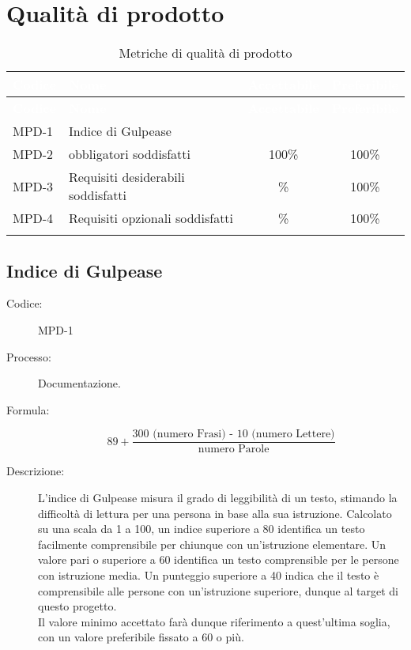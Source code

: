 \section{Qualità di prodotto} \label{sec:qualityprod}

{
\setlength{\tabcolsep}{10pt}
\renewcommand{\arraystretch}{1.5}
\begin{xltabular}{\textwidth}{| l | X | c | c |}
    \hline
     \textbf{\textcolor{white}{Codice}} & \textbf{\textcolor{white}{Nome}} & \textbf{\textcolor{white}{Accettabile}} & \textbf{\textcolor{white}{Preferibile}} \\
    \hline
    \endfirsthead
    \hline
     \textbf{\textcolor{white}{Codice}} & \textbf{\textcolor{white}{Nome}} & \textbf{\textcolor{white}{Accettabile}} & \textbf{\textcolor{white}{Preferibile}} \\ 
    \endhead
    MPD-1 & Indice di Gulpease &  &  \\
    \hline
    MPD-2 &  obbligatori soddisfatti & 100\% & 100\% \\
    \hline
    MPD-3 & Requisiti desiderabili soddisfatti & \% & 100\% \\
    \hline
    MPD-4 & Requisiti opzionali soddisfatti & \% & 100\% \\
    \hline
     \caption{Metriche di qualità di prodotto}
    \label{tab:mpd}
\end{xltabular}
}

\subsection{Indice di Gulpease}
\begin{description}
    \item[Codice:] MPD-1
    \item[Processo:] Documentazione.
    \item[Formula:] 
    \begin{equation}
    89 +
    \frac{\text{300 (numero Frasi) - 10 (numero Lettere)}}{\text{numero Parole}}
    \label{MPD-1}
    \end{equation}
    \item[Descrizione:] L'indice di Gulpease misura il grado di leggibilità di un testo, stimando la difficoltà di lettura per una persona in base alla sua istruzione. Calcolato su una scala da 1 a 100, un indice superiore a 80 identifica un testo facilmente comprensibile per chiunque con un'istruzione elementare. Un valore pari o superiore a 60 identifica un testo comprensible per le persone con istruzione media. Un punteggio superiore a 40 indica che il testo è comprensibile alle persone con un'istruzione superiore, dunque al target di questo progetto.\\Il valore minimo accettato farà dunque riferimento a quest'ultima soglia, con un valore preferibile fissato a 60 o più.
\end{description}

